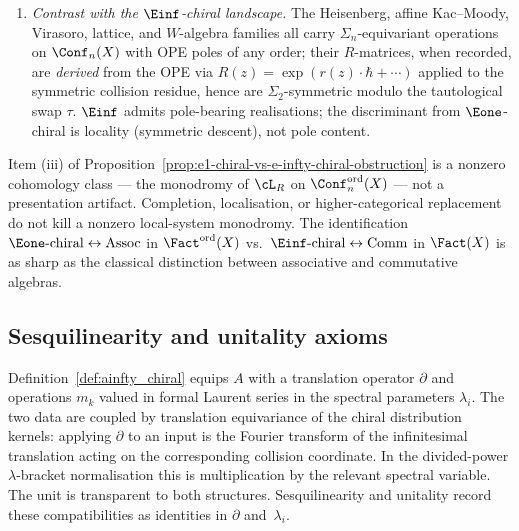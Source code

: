 \begin{proposition}
\begin{enumerate}[label=\textup{(\roman*)}]
\textup{(}Francis--Gaitsgory \cite{FG12}, IV.5, in the ordered
variant\textup{)}. The analogous functor to $\Fact(X)$ with
values in $\Einf$-chiral factorization algebras does \emph{not}
exist: the obstruction (iii) is detected by the non-vanishing of the
elementary-transposition monodromy of the local system $\cL_R$ of
Theorem~A$^{\infty,2}$, and equivalently by the fact that the
$R$-twisted $\Sigma_n$-descent of the ordered bar
$B^{\mathrm{ord}}(\Yhbar)$ does not degenerate to ordinary
$\Sigma_n$-coinvariants.
\item \emph{Contrast with the $\Einf$-chiral landscape.} The
Heisenberg, affine Kac--Moody, Virasoro, lattice, and $W$-algebra
families all carry $\Sigma_n$-equivariant operations on
$\Conf_n(X)$ with OPE poles of any order; their $R$-matrices, when
recorded, are \emph{derived} from the OPE via
$R(z) = \exp(r(z) \cdot \hbar + \cdots)$ applied to the symmetric
collision residue, hence are $\Sigma_2$-symmetric modulo the
tautological swap $\tau$. $\Einf$ admits pole-bearing realisations;
the discriminant from $\Eone$-chiral is locality (symmetric descent),
not pole content.
\end{enumerate}
\end{proposition}

\begin{remark}
\label{rem:e1-einf-chiral-sharp}
Item (iii) of Proposition~\ref{prop:e1-chiral-vs-e-infty-chiral-obstruction}
is a nonzero cohomology class — the monodromy of $\cL_R$ on
$\Conf_n^{\mathrm{ord}}(X)$ — not a presentation artifact. Completion,
localisation, or higher-categorical replacement do not kill a nonzero
local-system
monodromy. The identification
$\Eone\text{-chiral} \leftrightarrow \mathrm{Assoc}$ in
$\Fact^{\mathrm{ord}}(X)$ vs.\
$\Einf\text{-chiral} \leftrightarrow \mathrm{Comm}$ in $\Fact(X)$
is as sharp as the classical distinction between associative and
commutative algebras.
\end{remark}

\subsection{Sesquilinearity and unitality axioms}
\label{subsec:sesqui}

Definition~\ref{def:ainfty_chiral} equips $A$ with a translation
operator $\partial$ and operations $m_k$ valued in formal Laurent
series in the spectral parameters $\lambda_i$. The two data are
coupled by translation equivariance of the chiral distribution
kernels: applying $\partial$ to an input is the Fourier transform of
the infinitesimal translation acting on the corresponding collision
coordinate. In the divided-power $\lambda$-bracket normalisation this
is multiplication by the relevant spectral variable. The unit is
transparent to both structures. Sesquilinearity and unitality record
these compatibilities as identities in $\partial$ and~$\lambda_i$.

